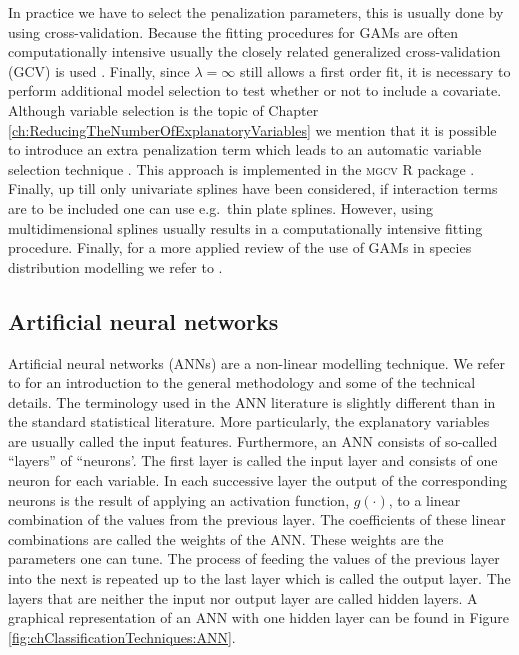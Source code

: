 In practice we have to select the penalization parameters, this is usually done by using cross-validation. Because the fitting procedures for GAMs are often computationally intensive usually the closely related generalized cross-validation (GCV) is used \parencite{wood_gams_2002}. Finally, since $\lambda = \infty$ still allows a first order fit, it is necessary to perform additional model selection to test whether or not to include a covariate. Although variable selection is the topic of Chapter \ref{ch:ReducingTheNumberOfExplanatoryVariables} we mention that it is possible to introduce an extra penalization term which leads to an automatic variable selection technique \parencite{marra_practical_2011}. This approach is implemented in the \textsc{mgcv} R package \parencite{mgcv}. \\

Finally, up till only univariate splines have been considered, if interaction terms are to be included one can use e.g.\ thin plate splines. However, using multidimensional splines usually results in a computationally intensive fitting procedure. Finally, for a more applied review of the use of GAMs in species distribution modelling we refer to \cite{guisan_generalized_2002}.

\subsection{Artificial neural networks}
Artificial neural networks (ANNs) are a non-linear modelling technique. We refer to \cite{bishop_neural_1995} for an introduction to the general methodology and some of the technical details. The terminology used in the ANN literature is slightly different than in the standard statistical literature. More particularly, the explanatory variables are usually called the input features. Furthermore, an ANN consists of so-called ``layers'' of ``neurons'. The first layer is called the input layer and consists of one neuron for each variable. In each successive layer the output of the corresponding neurons is the result of applying an activation function, $g(\cdot)$, to a linear combination of the values from the previous layer. The coefficients of these linear combinations are called the weights of the ANN. These weights are the parameters one can tune. The process of feeding the values of the previous layer into the next is repeated up to the last layer which is called the output layer. The layers that are neither the input nor output layer are called hidden layers. A graphical representation of an ANN with one hidden layer can be found in Figure \ref{fig:chClassificationTechniques:ANN}.

